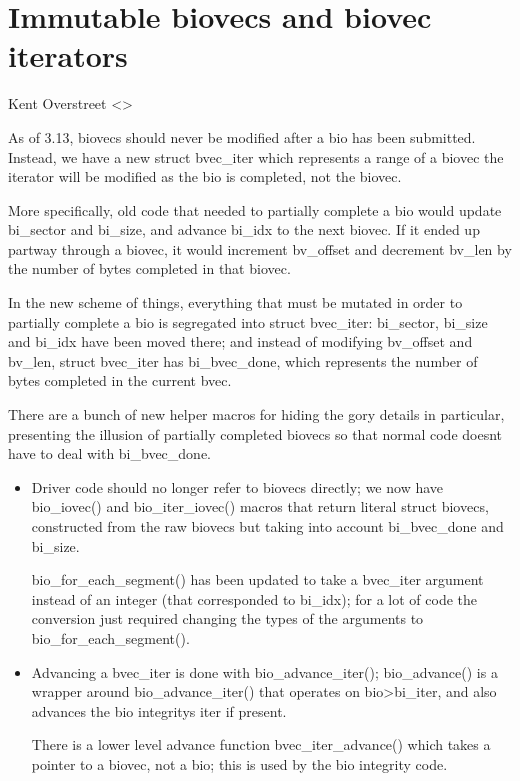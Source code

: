 \documentclass[a4paper,11pt,english]{sphinxmanual}
\begin{document}
\chapter{Immutable biovecs and biovec iterators}
\label{\detokenize{biovecs:immutable-biovecs-and-biovec-iterators}}\label{\detokenize{biovecs::doc}}
Kent Overstreet \textless{}\textgreater{}

As of 3.13, biovecs should never be modified after a bio has been submitted.
Instead, we have a new struct bvec\_iter which represents a range of a biovec \sphinxhyphen{}
the iterator will be modified as the bio is completed, not the biovec.

More specifically, old code that needed to partially complete a bio would
update bi\_sector and bi\_size, and advance bi\_idx to the next biovec. If it
ended up partway through a biovec, it would increment bv\_offset and decrement
bv\_len by the number of bytes completed in that biovec.

In the new scheme of things, everything that must be mutated in order to
partially complete a bio is segregated into struct bvec\_iter: bi\_sector,
bi\_size and bi\_idx have been moved there; and instead of modifying bv\_offset
and bv\_len, struct bvec\_iter has bi\_bvec\_done, which represents the number of
bytes completed in the current bvec.

There are a bunch of new helper macros for hiding the gory details \sphinxhyphen{} in
particular, presenting the illusion of partially completed biovecs so that
normal code doesn\textquotesingle{}t have to deal with bi\_bvec\_done.
\begin{itemize}
\item {} 
Driver code should no longer refer to biovecs directly; we now have
bio\_iovec() and bio\_iter\_iovec() macros that return literal struct biovecs,
constructed from the raw biovecs but taking into account bi\_bvec\_done and
bi\_size.

bio\_for\_each\_segment() has been updated to take a bvec\_iter argument
instead of an integer (that corresponded to bi\_idx); for a lot of code the
conversion just required changing the types of the arguments to
bio\_for\_each\_segment().

\item {} 
Advancing a bvec\_iter is done with bio\_advance\_iter(); bio\_advance() is a
wrapper around bio\_advance\_iter() that operates on bio\sphinxhyphen{}\textgreater{}bi\_iter, and also
advances the bio integrity\textquotesingle{}s iter if present.

There is a lower level advance function \sphinxhyphen{} bvec\_iter\_advance() \sphinxhyphen{} which takes
a pointer to a biovec, not a bio; this is used by the bio integrity code.

\end{itemize}
\end{document}
